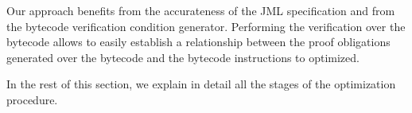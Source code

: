 Our approach benefits from the accurateness of the JML specification and from the bytecode verification condition generator. Performing the verification over the bytecode allows to easily establish a relationship between the proof obligations generated over the bytecode and the bytecode instructions to optimized.

In the rest of this section, we explain in detail all the stages of the optimization procedure.
